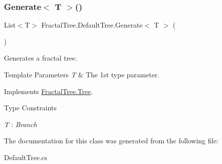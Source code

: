 \subsubsection{\texorpdfstring{Generate$<$ T $>$()}{Generate< T >()}}
{\footnotesize\ttfamily List$<$T$>$ Fractal\+Tree.\+Default\+Tree.\+Generate$<$ T $>$ (\begin{DoxyParamCaption}{ }\end{DoxyParamCaption})}



Generates a fractal tree. 


\begin{DoxyTemplParams}{Template Parameters}
{\em T} & The 1st type parameter.\\
\hline
\end{DoxyTemplParams}


Implements \hyperlink{interface_fractal_tree_1_1_tree}{Fractal\+Tree.\+Tree}.

\begin{Desc}
\item[Type Constraints]\begin{description}
\item[{\em T} : {\em Branch}]\end{description}
\end{Desc}


The documentation for this class was generated from the following file\+:\begin{DoxyCompactItemize}
\item 
Default\+Tree.\+cs\end{DoxyCompactItemize}
